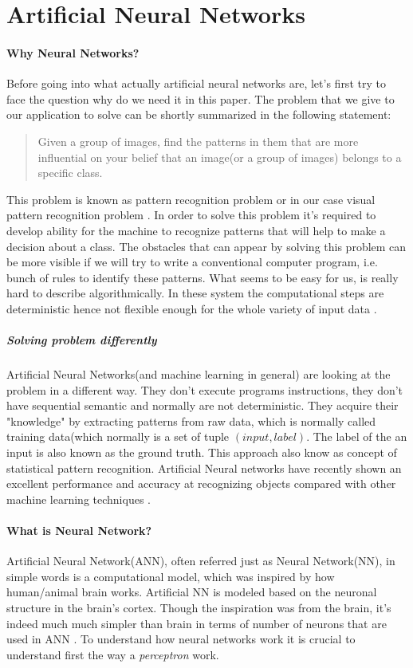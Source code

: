\section{Artificial Neural Networks}
\paragraph{Why Neural Networks?}
\label{sec:neural_networks}
Before going into what actually artificial neural networks are, let's first
try to face the question why do we need it in this paper. The problem that
we give to our application to solve can be shortly summarized in the following statement:
\blockquote{
Given a group of images, find the patterns in them that are more influential
on your belief that an image(or a group of images) belongs to a specific class.
}


This problem is known as pattern recognition problem or in our case
visual pattern recognition problem \cite{Bishop1995}.
In order to solve this problem it's required to develop ability for the machine
to recognize patterns that will help to make a decision about a class.
The obstacles that can appear by solving this problem can be more visible
if we will try to write a conventional computer program, i.e. bunch of rules
to identify these patterns. What seems to be easy for us, is really hard to describe
algorithmically. In these system the computational steps are deterministic
hence not flexible enough for the whole variety of input data \cite{Nielsen2015}.

\subparagraph{Solving problem differently}
Artificial Neural Networks(and machine learning in general) are looking at the problem
in a different way.
They don't execute programs instructions, they don't have
sequential semantic and normally are not
deterministic. They acquire their "knowledge" by extracting patterns from raw data,
which is normally called training data(which normally is a set of tuple $(input, label)$.
The label of the an input is also known as the ground truth.
This approach also know as concept of statistical pattern recognition. \cite{Bishop1995}
Artificial Neural networks have recently shown an excellent performance and
accuracy at recognizing objects compared with other
machine learning techniques \cite{Krizhevsky2012}.

\paragraph{What is Neural Network?}
Artificial Neural Network(ANN), often referred just as Neural Network(NN),
in simple words is a computational model, which was inspired by how human/animal
brain works. Artificial NN is modeled based on the neuronal structure in the brain's
cortex. Though the inspiration was from the brain,
it's indeed much much simpler than brain in terms of number of neurons that are used
in ANN \cite{Goodfellow-et-al-2016}.
To understand how neural networks work it is crucial to understand first the
way a \emph{perceptron} work.

